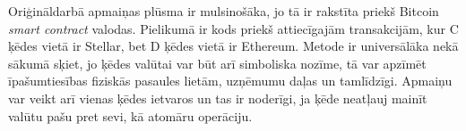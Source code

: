 Oriģināldarbā apmaiņas plūsma ir mulsinošāka, jo tā ir rakstīta priekš Bitcoin \textit{smart contract} valodas. Pielikumā ir kods priekš attiecīgajām transakcijām, kur C ķēdes vietā ir Stellar, bet D ķēdes vietā ir Ethereum.
Metode ir universālāka nekā sākumā sķiet, jo ķēdes valūtai var būt arī simboliska nozīme, tā var apzīmēt īpašumtiesības fiziskās pasaules lietām, uzņēmumu daļas un tamlīdzīgi.\cite{rosenfeld12}
Apmaiņu var veikt arī vienas ķēdes ietvaros un tas ir noderīgi, ja ķēde neatļauj mainīt valūtu pašu pret sevi, kā atomāru operāciju.
